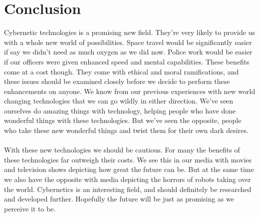 \documentclass[12pt,a4paper,notitlepage]{article}
\begin{document}
\section{Conclusion}
Cybernetic technologies is a promising new field. They're very likely to provide
us with a whole new world of possibilities. Space travel would be significantly
easier if say we didn't need as much oxygen as we did now. Police work would be
easier if our officers were given enhanced speed and mental capabilities. These
benefits come at a cost though. They come with ethical and moral ramifications,
and these issues should be examined closely before we decide to perform these
enhancements on anyone. We know from our previous experiences with new world
changing technologies that we can go wildly in either direction. We've seen
ourselves do amazing things with technology, helping people who have done
wonderful things with these technologies. But we've seen the opposite, people
who take these new wonderful things and twist them for their own dark desires.
\\\\
With these new technologies we should be cautious. For many the benefits of
these technologies far outweigh their costs. We see this in our media with
movies and television shows depicting how great the future can be. But at the
same time we also have the opposite with media depicting the horrors of robots
taking over the world. Cybernetics is an interesting field, and should
definitely be researched and developed further. Hopefully the future will be
just as promising as we perceive it to be.
\end{document}

